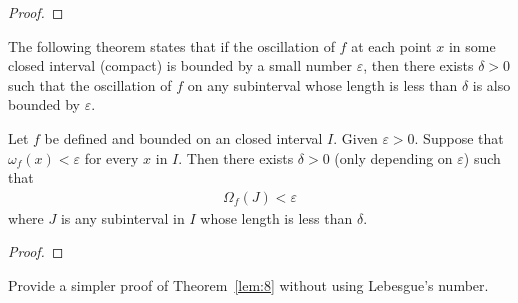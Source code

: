 \documentclass[thmcnt=section, 12pt]{my-elegantbook}
\begin{document}
\begin{proof}
\end{proof}


\begin{theorem} \label{thm:88}
\end{theorem}


The following theorem states that if the oscillation of $f$
at each point $x$ in some closed interval (compact) is bounded by 
a small number $\varepsilon$,
then there exists $\delta > 0$ such that the oscillation of $f$
on any subinterval whose length is less than $\delta$ is also 
bounded by $\varepsilon$.

\begin{lemma} \label{lem:8}
	Let $f$ be defined and bounded on an closed interval $I$.
	Given $\varepsilon > 0$.
	Suppose that $\omega_f(x) < \varepsilon$ for every $x$ 
	in $I$.
	Then there exists $\delta > 0$ (only depending on $\varepsilon$)
	such that 
	\begin{align*}
		\Omega_f(J) < \varepsilon
	\end{align*}
	where $J$ is any subinterval in $I$ whose length is less than $\delta$.
\end{lemma}

\begin{proof}
\end{proof}

\begin{exercise} \label{ex:10}
	Provide a simpler proof of Theorem~\ref{lem:8}
	without using Lebesgue's number.
\end{exercise}
\end{document}
